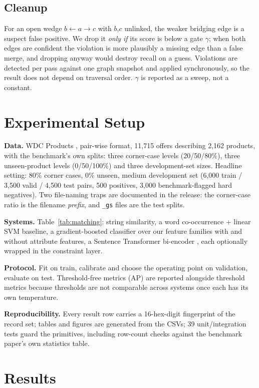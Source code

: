 \documentclass[conference]{IEEEtran}
\begin{document}
\subsection{Cleanup}
For an open wedge $b \leftarrow a \rightarrow c$ with $b$,$c$ unlinked, the weaker bridging edge is a
suspect false positive. We drop it \emph{only if} its score is below a gate $\gamma$; when both edges are
confident the violation is more plausibly a missing edge than a false merge, and dropping anyway would
destroy recall on a guess. Violations are detected per pass against one graph snapshot and applied
synchronously, so the result does not depend on traversal order. $\gamma$ is reported as a sweep, not a
constant.

\section{Experimental Setup}
\textbf{Data.} WDC Products \cite{peeters2024wdc}, pair-wise format, 11{,}715 offers describing 2{,}162
products, with the benchmark's own splits: three corner-case levels (20/50/80\%), three unseen-product
levels (0/50/100\%) and three development-set sizes. Headline setting: 80\% corner cases, 0\% unseen,
medium development set (6{,}000 train / 3{,}500 valid / 4{,}500 test pairs, 500 positives, 3{,}000
benchmark-flagged hard negatives). Two file-naming traps are documented in the release: the corner-case
ratio is the filename \emph{prefix}, and \texttt{\_gs} files are the test splits.

\textbf{Systems.} Table~\ref{tab:matching}: string similarity, a word co-occurrence + linear SVM baseline,
a gradient-boosted classifier over our feature families with and without attribute features, a Sentence
Transformer bi-encoder \cite{reimers2019sbert}, each optionally wrapped in the constraint layer.

\textbf{Protocol.} Fit on train, calibrate and choose the operating point on validation, evaluate on test.
Threshold-free metrics (AP) are reported alongside threshold metrics because thresholds are not comparable
across systems once each has its own temperature.

\textbf{Reproducibility.} Every result row carries a 16-hex-digit fingerprint of the record set; tables and
figures are generated from the CSVs; 39 unit/integration tests guard the primitives, including row-count
checks against the benchmark paper's own statistics table.

\section{Results}
\end{document}
